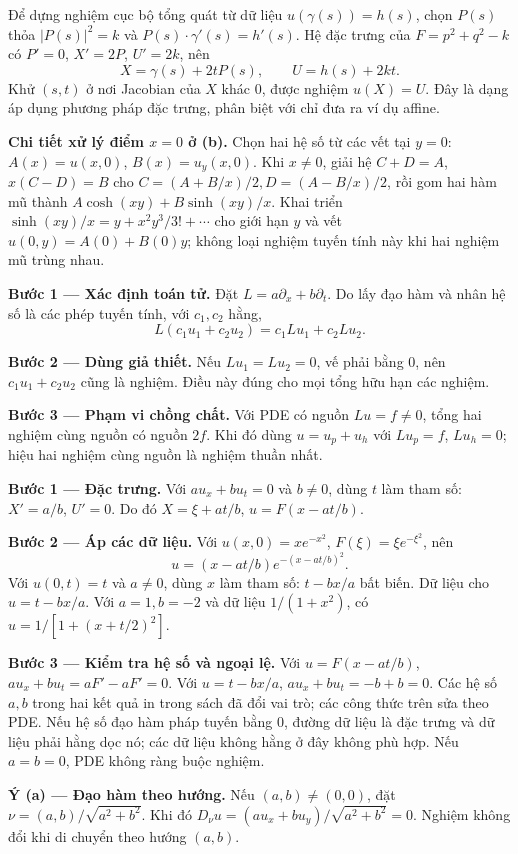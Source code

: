 Để dựng nghiệm cục bộ tổng quát từ dữ liệu $u(\gamma(s))=h(s)$, chọn $P(s)$ thỏa $|P(s)|^2=k$ và $P(s)\cdot\gamma'(s)=h'(s)$. Hệ đặc trưng của $F=p^2+q^2-k$ có $P'=0$, $X'=2P$, $U'=2k$, nên
\[X=\gamma(s)+2tP(s),\qquad U=h(s)+2kt.\]
Khử $(s,t)$ ở nơi Jacobian của $X$ khác 0, được nghiệm $u(X)=U$. Đây là dạng áp dụng phương pháp đặc trưng, phân biệt với chỉ đưa ra ví dụ affine.

\textbf{Chi tiết xử lý điểm $x=0$ ở (b).} Chọn hai hệ số từ các vết tại $y=0$: $A(x)=u(x,0)$, $B(x)=u_y(x,0)$. Khi $x\ne0$, giải hệ $C+D=A$, $x(C-D)=B$ cho $C=(A+B/x)/2,D=(A-B/x)/2$, rồi gom hai hàm mũ thành $A\cosh(xy)+B\sinh(xy)/x$. Khai triển $\sinh(xy)/x=y+x^2y^3/3!+\cdots$ cho giới hạn $y$ và vết $u(0,y)=A(0)+B(0)y$; không loại nghiệm tuyến tính này khi hai nghiệm mũ trùng nhau.

\textbf{Bước 1 — Xác định toán tử.} Đặt $L=a\partial_x+b\partial_t$. Do lấy đạo hàm và nhân hệ số là các phép tuyến tính, với $c_1,c_2$ hằng,
\[L(c_1u_1+c_2u_2)=c_1Lu_1+c_2Lu_2.\]

\textbf{Bước 2 — Dùng giả thiết.} Nếu $Lu_1=Lu_2=0$, vế phải bằng 0, nên $c_1u_1+c_2u_2$ cũng là nghiệm. Điều này đúng cho mọi tổng hữu hạn các nghiệm.

\textbf{Bước 3 — Phạm vi chồng chất.} Với PDE có nguồn $Lu=f\ne0$, tổng hai nghiệm cùng nguồn có nguồn $2f$. Khi đó dùng $u=u_p+u_h$ với $Lu_p=f$, $Lu_h=0$; hiệu hai nghiệm cùng nguồn là nghiệm thuần nhất.

\textbf{Bước 1 — Đặc trưng.} Với $au_x+bu_t=0$ và $b\ne0$, dùng $t$ làm tham số: $X'=a/b$, $U'=0$. Do đó $X=\xi+at/b$, $u=F(x-at/b)$.

\textbf{Bước 2 — Áp các dữ liệu.} Với $u(x,0)=xe^{-x^2}$, $F(\xi)=\xi e^{-\xi^2}$, nên
\[u=(x-at/b)e^{-(x-at/b)^2}.\]
Với $u(0,t)=t$ và $a\ne0$, dùng $x$ làm tham số: $t-bx/a$ bất biến. Dữ liệu cho $u=t-bx/a$. Với $a=1,b=-2$ và dữ liệu $1/(1+x^2)$, có $u=1/[1+(x+t/2)^2]$.

\textbf{Bước 3 — Kiểm tra hệ số và ngoại lệ.} Với $u=F(x-at/b)$, $au_x+bu_t=aF'-aF'=0$. Với $u=t-bx/a$, $au_x+bu_t=-b+b=0$. Các hệ số $a,b$ trong hai kết quả in trong sách đã đổi vai trò; các công thức trên sửa theo PDE. Nếu hệ số đạo hàm pháp tuyến bằng 0, đường dữ liệu là đặc trưng và dữ liệu phải hằng dọc nó; các dữ liệu không hằng ở đây không phù hợp. Nếu $a=b=0$, PDE không ràng buộc nghiệm.

\textbf{Ý (a) — Đạo hàm theo hướng.} Nếu $(a,b)\ne(0,0)$, đặt $\nu=(a,b)/\sqrt{a^2+b^2}$. Khi đó $D_\nu u=(au_x+bu_y)/\sqrt{a^2+b^2}=0$. Nghiệm không đổi khi di chuyển theo hướng $(a,b)$.

